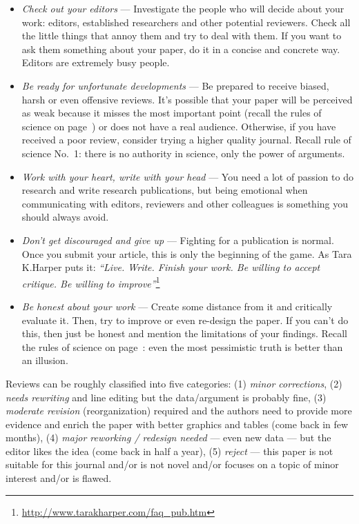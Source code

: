 \documentclass[graybox,envcountchap,sectrefs,UStrade]{svmono}
\begin{document}
\begin{itemize}
\item \emph{Check out your editors} --- Investigate the people who will decide about your work: editors, established researchers and other potential reviewers. Check all the little things that annoy them and try to deal with them. If you want to ask them something about your paper, do it in a concise and concrete way. Editors are extremely busy people.
\item \emph{Be ready for unfortunate developments} --- Be prepared to receive biased, harsh or even offensive reviews. It's possible that your paper will be perceived as weak because it misses the most important point (recall the rules of science on page~\pageref{F:rules}) or does not have a real audience. Otherwise, if you have received a poor review, consider trying a higher quality journal. Recall rule of science No.~1: there is no authority in science, only the power of arguments.
\item \emph{Work with your heart, write with your head} --- You need a lot of passion to do research and write research publications, but being emotional when communicating with editors, reviewers and other colleagues is something you should always avoid.
\item \emph{Don't get discouraged and give up} --- Fighting for a publication is normal. Once you submit your article, this is only the beginning of the game. As Tara K.\@ Harper puts it: \emph{``Live. Write. Finish your work. Be willing to accept critique. Be willing to improve''}\footnote{\url{http://www.tarakharper.com/faq_pub.htm}}
\item \emph{Be honest about your work} --- Create some distance from it and critically evaluate it. Then, try to improve or even re-design the paper. If you can't do this, then just be honest and mention the limitations of your findings. Recall the rules of science on page~\pageref{F:rules}: even the most pessimistic truth is better than an illusion.
\end{itemize}

Reviews can be roughly classified into five categories: (1) \emph{minor corrections}, (2) \emph{needs rewriting} and line editing but the data/argument is probably fine, (3) \emph{moderate revision} (reorganization) required and the authors need to provide more evidence and enrich the paper with better graphics and tables (come back in few months), (4) \emph{major reworking / redesign needed} --- even new data --- but the editor likes the idea (come back in half a year), (5) \emph{reject} --- this paper is not suitable for this journal and/or is not novel and/or focuses on a topic of minor interest and/or is flawed.  \par
\end{document}

